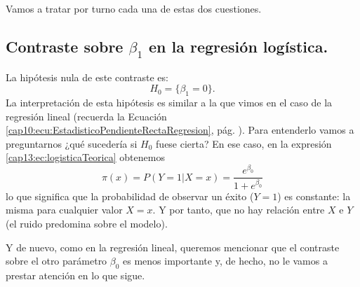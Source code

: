 Vamos a tratar por turno cada una de estas dos cuestiones.

\subsection{Contraste sobre $\beta_1$ en la regresión logística.}
\label{cap13:subsec:ContrastePendienteRegresionLogistica}

La hipótesis nula de este contraste es:
	\[  H_0=\{\beta_1= 0\}.\]
La interpretación de esta hipótesis es similar a la que vimos en el caso de la regresión lineal (recuerda la Ecuación \ref{cap10:ecu:EstadisticoPendienteRectaRegresion}, pág. \pageref{cap10:ecu:EstadisticoPendienteRectaRegresion}). Para entenderlo vamos a preguntarnos ¿qué sucedería si $H_0$ fuese cierta? En ese caso,  en la expresión
\ref{cap13:ec:logisticaTeorica}  obtenemos
 \begin{equation}
 \label{cap13:ecu:ModeloRegresionLogisticaProbabilidadConstante}
 \pi(x)=P(Y=1|X=x)=\dfrac{e^{\beta_0}}{1+e^{\beta_0}}
 \end{equation}
 lo que  significa que la probabilidad de observar un éxito ($Y=1$)  es constante:  la misma para cualquier valor $X=x$.  Y por tanto, que no hay relación entre $X$ e  $Y$ (el ruido predomina sobre el modelo).

 Y de nuevo, como en la regresión lineal, queremos mencionar que el contraste sobre el otro parámetro $\beta_0$ es menos importante y, de hecho, no le vamos a prestar atención en lo que sigue.

